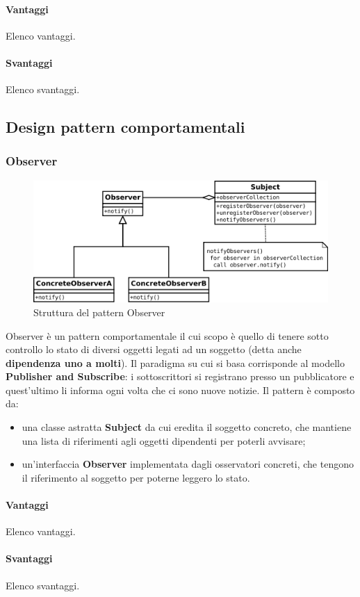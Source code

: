 \documentclass[../SpecificaTecnica.tex]{subfiles}
\begin{document}
			\paragraph{Vantaggi}
				Elenco vantaggi.
			\paragraph{Svantaggi}
				Elenco svantaggi.
	\subsection{Design pattern comportamentali}
		\subsubsection{Observer}
			\begin{figure}[!h]
				\centering
				\includegraphics[scale=0.7]{pattern/observer}
				\caption{Struttura del pattern Observer}
				\label{fig:Struttura_Observer}
			\end{figure}
			Observer è un pattern comportamentale il cui scopo è quello di tenere sotto controllo lo stato di diversi oggetti legati ad un soggetto (detta anche \textbf{dipendenza uno a molti}). Il paradigma su cui si basa corrisponde al modello \textbf{Publisher and Subscribe}: i sottoscrittori si registrano presso un pubblicatore e quest'ultimo li informa ogni volta che ci sono nuove notizie. Il pattern è composto da:
				\begin{itemize}
					\item una classe astratta \textbf{Subject} da cui eredita il soggetto concreto, che mantiene una lista di riferimenti agli oggetti dipendenti per poterli avvisare;
					\item un'interfaccia \textbf{Observer} implementata dagli osservatori concreti, che tengono il riferimento al soggetto per poterne leggero lo stato.
				\end{itemize}
			\paragraph{Vantaggi}
				Elenco vantaggi.
			\paragraph{Svantaggi}
				Elenco svantaggi.
\end{document}

